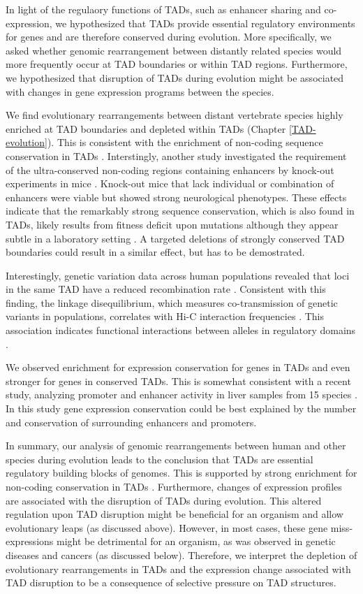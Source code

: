 \documentclass[a4paper,twoside=true,openright,parskip=full,chapterprefix=true,11pt,headings=normal,bibliography=totoc,listof=totoc,titlepage=on,captions=tableabove,draft=false]{scrreprt}
\theoremstyle{definition}
\theoremstyle{definition}
\theoremstyle{definition}
\theoremstyle{remark}
\begin{document}
In light of the regulaory functions of TADs, such as enhancer sharing
and co-expression, we hypothesized that TADs provide essential
regulatory environments for genes and are therefore conserved during
evolution. More specifically, we asked whether genomic rearrangement
between distantly related species would more frequently occur at TAD
boundaries or within TAD regions. Furthermore, we hypothesized that
disruption of TADs during evolution might be associated with changes in
gene expression programs between the species.

We find evolutionary rearrangements between distant vertebrate species
highly enriched at TAD boundaries and depleted within TADs (Chapter
\ref{TAD-evolution}). This is consistent with the enrichment of
non-coding sequence conservation in TADs
\citep{Harmston2017, Polychronopoulos2017}. Interstingly, another study
investigated the requirement of the ultra-conserved non-coding regions
containing enhancers by knock-out experiments in mice
\citep{Dickel2018}. Knock-out mice that lack individual or combination
of enhancers were viable but showed strong neurological phenotypes.
These effects indicate that the remarkably strong sequence conservation,
which is also found in TADs, likely results from fitness deficit upon
mutations although they appear subtle in a laboratory setting
\citep{Dickel2018}. A targeted deletions of strongly conserved TAD
boundaries could result in a similar effect, but has to be demostrated.

Interestingly, genetic variation data across human populations revealed
that loci in the same TAD have a reduced recombination rate
\citep{Liu2016b}. Consistent with this finding, the linkage
disequilibrium, which measures co-transmission of genetic variants in
populations, correlates with Hi-C interaction frequencies
\citep{Gerber2018}. This association indicates functional interactions
between alleles in regulatory domains \citep{Liu2016b}.

We observed enrichment for expression conservation for genes in TADs and
even stronger for genes in conserved TADs. This is somewhat consistent
with a recent study, analyzing promoter and enhancer activity in liver
samples from 15 species \citep{Berthelot2017}. In this study gene
expression conservation could be best explained by the number and
conservation of surrounding enhancers and promoters.

In summary, our analysis of genomic rearrangements between human and
other species during evolution leads to the conclusion that TADs are
essential regulatory building blocks of genomes. This is supported by
strong enrichment for non-coding conservation in TADs
\citep{Harmston2017}. Furthermore, changes of expression profiles are
associated with the disruption of TADs during evolution. This altered
regulation upon TAD disruption might be beneficial for an organism and
allow evolutionary leaps (as discussed above). However, in most cases,
these gene miss-expressions might be detrimental for an organism, as was
observed in genetic diseases and cancers (as discussed below).
Therefore, we interpret the depletion of evolutionary rearrangements in
TADs and the expression change associated with TAD disruption to be a
consequence of selective pressure on TAD structures.
\end{document}
